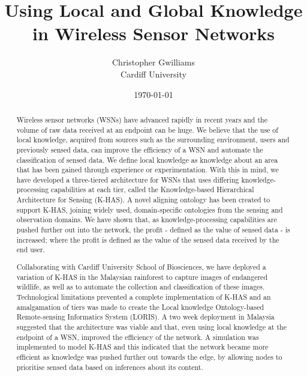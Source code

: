 \documentclass[12pt, a4paper]{report}
\begin{document}
\title{Using Local and Global Knowledge in Wireless Sensor Networks}
\author{Christopher Gwilliams\\Cardiff University}
\date{\today}
\maketitle 
{}
\tableofcontents
\listoffigures
\listoftables

\begin{abstract}
Wireless sensor networks (WSNs) have advanced rapidly in recent years and the volume of raw data received at an endpoint can be huge. We believe that the use of local knowledge, acquired from sources such as the surrounding environment, users and previously sensed data, can improve the efficiency of a WSN and automate the classification of sensed data. We define local knowledge as knowledge about an area that has been gained through experience or experimentation. With this in mind, we have developed a three-tiered architecture for WSNs that uses differing knowledge-processing capabilities at each tier, called the Knowledge-based Hierarchical Architecture for Sensing (K-HAS). A novel aligning ontology has been created to support K-HAS, joining widely used, domain-specific ontologies from the sensing and observation domains. We have shown that, as knowledge-processing capabilities are pushed further out into the network, the profit - defined as the value of sensed data - is increased; where the profit is defined as the value of the sensed data received by the end user.

Collaborating with Cardiff University School of Biosciences, we have deployed a variation of K-HAS in the Malaysian rainforest to capture images of endangered wildlife, as well as to automate the collection and classification of these images. Technological limitations prevented a complete implementation of K-HAS and an amalgamation of tiers was made to create the Local knowledge Ontology-based Remote-sensing Informatics System (LORIS). A two week deployment in Malaysia suggested that the architecture was viable and that, even using local knowledge at the endpoint of a WSN, improved the efficiency of the network. A simulation was implemented to model K-HAS and this indicated that the network became more efficient as knowledge was pushed further out towards the edge, by allowing nodes to prioritise sensed data based on inferences about its content.
\end{abstract}















\end{document}
